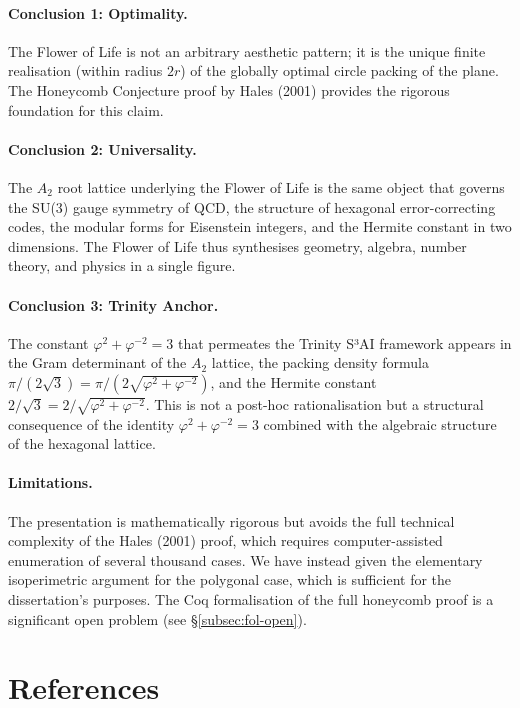 \paragraph{Conclusion 1: Optimality.}
The Flower of Life is not an arbitrary aesthetic pattern; it is the
unique finite realisation (within radius \(2r\)) of the globally optimal
circle packing of the plane.  The Honeycomb Conjecture proof by Hales (2001)
provides the rigorous foundation for this claim.

\paragraph{Conclusion 2: Universality.}
The \(A_2\) root lattice underlying the Flower of Life is the same object
that governs the SU(3) gauge symmetry of QCD, the structure of hexagonal
error-correcting codes, the modular forms for Eisenstein integers, and
the Hermite constant in two dimensions.  The Flower of Life thus
synthesises geometry, algebra, number theory, and physics in a single
figure.

\paragraph{Conclusion 3: Trinity Anchor.}
The constant \(\varphi^2+\varphi^{-2}=3\) that permeates the Trinity S³AI
framework appears in the Gram determinant of the \(A_2\) lattice, the
packing density formula \(\pi/(2\sqrt{3})=\pi/(2\sqrt{\varphi^2+\varphi^{-2}})\),
and the Hermite constant \(2/\sqrt{3}=2/\sqrt{\varphi^2+\varphi^{-2}}\).
This is not a post-hoc rationalisation but a structural consequence of the
identity \(\varphi^2+\varphi^{-2}=3\) combined with the algebraic structure
of the hexagonal lattice.

\paragraph{Limitations.}
The presentation is mathematically rigorous but avoids the full technical
complexity of the Hales (2001) proof, which requires computer-assisted
enumeration of several thousand cases.  We have instead given the
elementary isoperimetric argument for the polygonal case, which is
sufficient for the dissertation's purposes.  The Coq formalisation of
the full honeycomb proof is a significant open problem (see §\ref{subsec:fol-open}).

\section{References}
\label{sec:fol-references}

